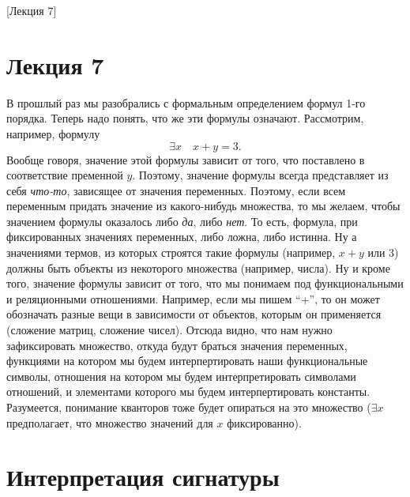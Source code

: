 [Лекция 7]

\section{Лекция 7}

В прошлый раз мы разобрались с формальным определением формул 1-го порядка.
Теперь надо понять, что же эти формулы означают.
Рассмотрим, например, формулу
$$
    \exists x \quad x + y = 3.
$$
Вообще говоря, значение этой формулы зависит от того, что поставлено в соответствие пременной $y$.
Поэтому, значение формулы всегда представляет из себя {\it что-то}, зависящее от значения переменных.
Поэтому, если всем переменным придать значение из какого-нибудь множества, то мы желаем, чтобы значением формулы оказалось либо {\it да}, либо {\it нет}.
То есть, формула, при фиксированных значениях переменных, либо ложна, либо истинна.
Ну а значениями термов, из которых строятся такие формулы (например, $x + y$ или 3) должны быть объекты из некоторого множества (например, числа).
Ну и кроме того, значение формулы зависит от того, что мы понимаем под функциональными и реляционными отношениями.
Например, если мы пишем \enquote{+}, то он может обозначать разные вещи в зависимости от объектов, которым он применяется (сложение матриц, сложение чисел).
Отсюда видно, что нам нужно зафиксировать множество, откуда будут браться значения переменных, функциями на котором мы будем интерпертировать наши функциональные символы, отношения на котором мы будем интерпретировать символами отношений, и элементами которого мы будем интерпертировать константы.
Разумеется, понимание кванторов тоже будет опираться на это множество ($\exists x$ предполагает, что множество значений для $x$ фиксированно).

\section{Интерпретация сигнатуры}

